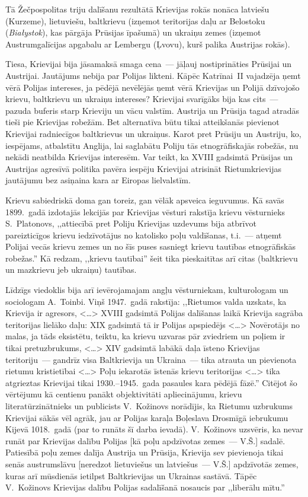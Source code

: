 \documentclass[twoside,a5paper,12pt,fleqn,openany]{extbook}
\newcommand{\pltxti}[1]{\textit{\textpolish{#1}}}
\newcommand{\citespace}{<\dots{}>}
\begin{document}
Tā Žečpospolitas triju dalīšanu rezultātā Krievijas rokās nonāca latviešu (Kurzeme), lietuviešu, baltkrievu (izņemot teritorijas daļu ar Belostoku (\pltxti{Białystok}), kas pārgāja Prūsijas īpašumā) un ukraiņu zemes (izņemot Austrumgalīcijas apgabalu ar Lembergu (Ļvovu), kurš palika Austrijas rokās).

Tiesa, Krievijai bija jāsamaksā smaga cena~--- jāļauj nostiprināties Prūsijai un Austrijai. Jautājums nebija par Polijas likteni. Kāpēc Katrīnai~II vajadzēja ņemt vērā Polijas intereses, ja pēdējā nevēlējās ņemt vērā Krievijas un Polijā dzīvojošo krievu, baltkrievu un ukraiņu intereses? Krievijai svarīgāks bija kas cits~--- pazuda buferis starp Krieviju un vācu valstīm. Austrija un Prūsija tagad atradās tieši pie Krievijas robežām. Bet alternatīva būtu tikai atteikšanās pievienot Krievijai radniecīgos baltkrievus un ukraiņus. Karot pret Prūsiju un Austriju, ko, iespējams, atbalstītu Anglija, lai saglabātu Poliju tās etnogrāfiskajās robežās, nu nekādi neatbilda Krievijas interesēm. Var teikt, ka XVIII gadsimtā Prūsijas un Austrijas agresīvā politika pavēra iespēju Krievijai atrisināt Rietumkrievijas jautājumu bez asiņaina kara ar Eiropas lielvalstīm.

Krievu sabiedriskā doma gan toreiz, gan vēlāk apsveica ieguvumus. Kā savās 1899.~gadā izdotajās lekcijās par Krievijas vēsturi rakstīja krievu vēsturnieks S.~Platonovs, ,,attiecībā pret Poliju Krievijas uzdevums bija atbrīvot pareizticīgos krievu iedzīvotājus no katolisko poļu valdīšanas, t.i.~--- atņemt Polijai vecās krievu zemes un no šīs puses sasniegt krievu tautības etnogrāfiskās robežas.'' Kā redzam, ,,krievu tautībai'' šeit tika pieskaitītas arī citas (baltkrievu un mazkrievu jeb ukraiņu) tautības.

Līdzīgs viedoklis bija arī ievērojamajam angļu vēsturniekam, kulturologam un sociologam A.~Toinbi. Viņš 1947.~gadā rakstīja: ,,Rietumos valda uzskats, ka Krievija ir agresors, \citespace{} XVIII gadsimtā Polijas dalīšanas laikā Krievija sagrāba teritorijas lielāko daļu: XIX gadsimtā tā ir Polijas apspiedējs \citespace{} Novērotājs no malas, ja tāds eksistētu, teiktu, ka krievu uzvaras pār zviedriem un poļiem ir tikai pretuzbrukums, \citespace{} XIV gadsimtā labākā daļa īsteno Krievijas teritoriju~--- gandrīz visa Baltkrievija un Ukraina~--- tika atrauta un pievienota rietumu kristietībai \citespace{} Poļu iekarotās īstenās krievu teritorijas \citespace{} tika atgrieztas Krievijai tikai 1930.--1945.~gada pasaules kara pēdējā fāzē.'' Citējot šo vērtējumu kā centienu panākt objektivitāti apliecinājumu, krievu literatūrzinātnieks un publicists V.~Kožinovs norādījis, ka Rietumu uzbrukums Krievijai sākās vēl agrāk, jau ar Polijas karaļa Boļeslava Drosmīgā iebrukumu Kijevā 1018.~gadā (par to runāts šī darba ievadā). V.~Kožinovs uzsvēris, ka nevar runāt par Krievijas dalību Polijas [kā poļu apdzīvotas zemes~--- V.Š.] sadalē. Patiesībā poļu zemes dalīja Austrija un Prūsija, Krievija sev pievienoja tikai senās austrumslāvu [neredzot lietuviešus un latviešus~--- V.Š.] apdzīvotās zemes, kuras arī mūsdienās ietilpst Baltkrievijas un Ukrainas sastāvā. Tāpēc V.~Kožinovs Krievijas dalību Polijas sadalīšanā nosaucis par ,,liberālu mītu.''
\end{document}
